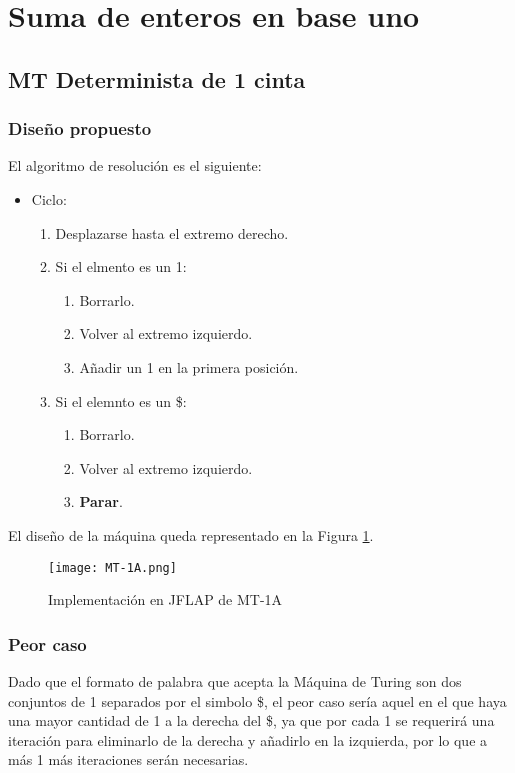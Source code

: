 \section{Suma de enteros en base uno}


\subsection{MT Determinista de 1 cinta}

\subsubsection*{Diseño propuesto}
El algoritmo de resolución es el siguiente:

\begin{itemize}
    \item Ciclo:
    \begin{enumerate}[1.]
        \item Desplazarse hasta el extremo derecho.
        \item Si el elmento es un 1:
        \begin{enumerate}[1.]
            \item Borrarlo.
            \item Volver al extremo izquierdo.
            \item Añadir un 1 en la primera posición.
        \end{enumerate}
        \item Si el elemnto es un \$:
        \begin{enumerate}[1.]
            \item Borrarlo.
            \item Volver al extremo izquierdo.
            \item \textbf{Parar}.
        \end{enumerate}
    \end{enumerate}
\end{itemize}

El diseño de la máquina queda representado en la Figura \ref{fig:MT-1A}.

\begin{figure}[h]
    \centering
    \texttt{[image: MT-1A.png]}
    \caption{Implementación en JFLAP de MT-1A}
    \label{fig:MT-1A}
\end{figure}


\subsubsection*{Peor caso}
Dado que el formato de palabra que acepta la Máquina de Turing son dos conjuntos de 1 separados por el simbolo \$, el peor caso sería aquel en el que haya una mayor cantidad de 1 a la derecha del \$, ya que por cada 1 se requerirá una iteración para eliminarlo de la derecha y añadirlo en la izquierda, por lo que a más 1 más iteraciones serán necesarias.

